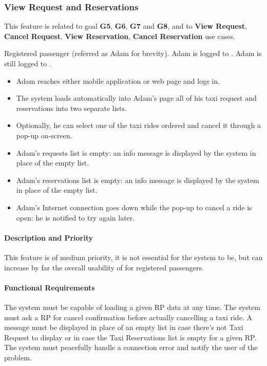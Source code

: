 \subsubsection{View Request and Reservations}
This feature is related to goal \textbf{G5}, \textbf{G6}, \textbf{G7} and \textbf{G8}, and to \textbf{View Request}, \textbf{Cancel Request}, \textbf{View Reservation}, \textbf{Cancel Reservation} use cases.
\begin{itemize}
	 Registered passenger (referred as Adam for brevity).
	 Adam is logged to \myTaxiService{}.
	 Adam is still logged to \myTaxiService{}.
	\begin{itemize}
		\item Adam reaches either \myTaxiService{} mobile application or web page and logs in.
		\item The system loads automatically into Adam's page all of his taxi request and reservations into two separate lists.
		\item Optionally, he can select one of the taxi rides ordered and cancel it through a pop-up on-screen.
	\end{itemize}
	\begin{itemize}
		\item Adam's requests list is empty: an info message is displayed by the system in place of the empty list.
		\item Adam's reservations list is empty: an info message is displayed by the system in place of the empty list.
		\item Adam's Internet connection goes down while the pop-up to cancel a ride is open: he is notified to try again later.
	\end{itemize}
\end{itemize}
\paragraph{Description and Priority}
This feature is of medium priority, it is not essential for the system to be, but can increase by far the overall usability of \myTaxiService{} for registered passengers.\par
\paragraph{Functional Requirements}
\begin{itemize}
	 The system must be capable of loading a given RP data at any time.
	 The system must ask a RP for cancel confirmation before actually cancelling a taxi ride.
	 A message must be displayed in place of an empty list in case there's not Taxi Request to display or in case the Taxi Reservations list is empty for a given RP.
	 The system must peacefully handle a connection error and notify the user of the problem.
\end{itemize}
